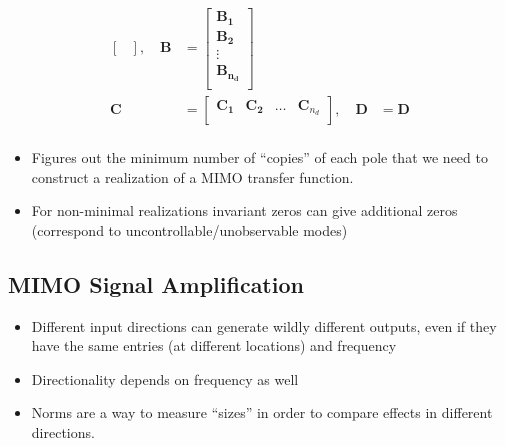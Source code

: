 \begin{enumerate}
\begin{align*}
\begin{bmatrix}
                            \end{bmatrix},\quad
              \mathbf{B} & =\begin{bmatrix}
                                \mathbf{B_1}     \\
                                \mathbf{B_2}     \\
                                \vdots           \\
                                \mathbf{B_{n_d}} \\
                            \end{bmatrix}                                                                               \\
              \mathbf{C} & =\begin{bmatrix}
                                \mathbf{C_1} & \mathbf{C_2} & \dots & \mathbf{C}_{n_d} \\
                            \end{bmatrix}, \quad
              \mathbf{D} & = \mathbf{D}                                                                                                           \\
          \end{align*}
\end{enumerate}


\begin{itemize}
    \item Figures out the minimum number of ``copies'' of each pole that we need to construct a realization of a MIMO transfer function.
    \item For non-minimal realizations invariant zeros can give additional zeros (correspond to uncontrollable/unobservable modes)
\end{itemize}

\subsection{MIMO Signal Amplification}


\begin{itemize}
    \item Different input directions can generate wildly different outputs, even if they have the same entries (at different locations) and frequency
    \item Directionality depends on frequency as well
    \item Norms are a way to measure ``sizes'' in order to compare effects in different directions.
\end{itemize}

